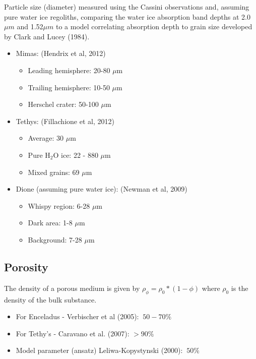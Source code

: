 \documentclass[11pt]{article} %
\begin{document}
Particle size (diameter) measured using the Cassini observations and, assuming pure water ice regoliths, comparing the water ice absorption band depths at 2.0$\mu m$ and 1.52$\mu m$ to a model correlating absorption depth to grain size developed by Clark and Lucey (1984).

	\begin{itemize}
	\item Mimas: (Hendrix et al, 2012)
	\begin{itemize}
		\item Leading hemisphere: 20-80 $\mu$m
		\item Trailing hemisphere: 10-50 $\mu$m
		\item Herschel crater: 50-100 $\mu$m
	\end{itemize}

	\item Tethys: (Fillachione et al, 2012)
	\begin{itemize}
		\item Average: 30 $\mu$m
		\item Pure H$_{2}$O ice: 22 - 880 $\mu$m
		\item Mixed grains: 69 $\mu$m
	\end{itemize}

	\item Dione (assuming pure water ice): (Newman et al, 2009)
	\begin{itemize}
		\item Whispy region: 6-28 $\mu$m
		\item Dark area: 1-8 $\mu$m
		\item Background: 7-28 $\mu$m
	\end{itemize}
	\end{itemize}

\subsection{Porosity}
\label{sec:porosity}

	The density of a porous medium is given by $\rho_{\phi} = \rho_{0}*(1-\phi)$ where $\rho_{0}$ is the density of the bulk substance. 

	\begin{itemize}
	\item For Enceladus - Verbischer et al (2005): $~50-70\%$
	\item For Tethy's - Caravano et al. (2007): $>90\%$ 
	\item Model parameter (ansatz) Leliwa-Kopystynski (2000): $~50\%$
	\end{itemize}
	
\end{document}
